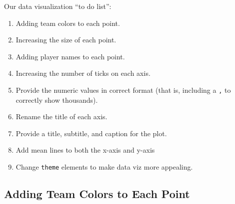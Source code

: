 \documentclass[
  letterpaper,
]{krantz}
\providecommand{\tightlist}{%
  \setlength{\itemsep}{0pt}\setlength{\parskip}{0pt}}\usepackage{longtable,booktabs,array}
\begin{document}
\begin{tcolorbox}[enhanced jigsaw, left=2mm, toprule=.15mm, opacitybacktitle=0.6, leftrule=.75mm, bottomrule=.15mm, colbacktitle=quarto-callout-note-color!10!white, breakable, colback=white, bottomtitle=1mm, toptitle=1mm, title=\textcolor{quarto-callout-note-color}{\faInfo}\hspace{0.5em}{Note}, coltitle=black, titlerule=0mm, arc=.35mm, opacityback=0, colframe=quarto-callout-note-color-frame, rightrule=.15mm]

Our data visualization ``to do list'':

\begin{enumerate}
\def\labelenumi{\arabic{enumi}.}
\tightlist
\item
  Adding team colors to each point.
\item
  Increasing the size of each point.
\item
  Adding player names to each point.
\item
  Increasing the number of ticks on each axis.
\item
  Provide the numeric values in correct format (that is, including a
  \texttt{,} to correctly show thousands).
\item
  Rename the title of each axis.
\item
  Provide a title, subtitle, and caption for the plot.
\item
  Add mean lines to both the x-axis and y-axis
\item
  Change \texttt{theme} elements to make data viz more appealing.
\end{enumerate}

\end{tcolorbox}

\hypertarget{adding-team-colors-to-each-point}{%
\subsection{Adding Team Colors to Each
Point}\label{adding-team-colors-to-each-point}}
\end{document}

